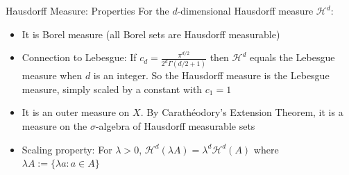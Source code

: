 \documentclass{beamer}
\DeclareMathOperator{\diam}{diam}
\begin{document}
        
    
    

\begin{frame}{Hausdorff Measure: Properties}
    For the $d$-dimensional Hausdorff measure $\mathcal{H}^d$:
    \begin{itemize}
        \item It is Borel measure (all Borel sets are Hausdorff measurable)
        \item Connection to Lebesgue: If $c_d = \frac{\pi^{d/2}}{2^d\Gamma(d/2+1)}$ then $\mathcal{H}^d$ equals the Lebesgue measure when $d$ is an integer. So the Hausdorff measure is the Lebesgue measure, simply scaled by a constant with $c_1 = 1$
        \item It is an outer measure on $X$. By Carathéodory's Extension Theorem, it is a measure on the $\sigma$-algebra of Hausdorff measurable sets
        

        \item Scaling property: For $\lambda > 0$, $\mathcal{H}^d(\lambda A) = \lambda^d \mathcal{H}^d(A)$ where $\lambda A:=\{\lambda a:a\in A\}$


    \end{itemize}
\end{frame}
\end{document}
